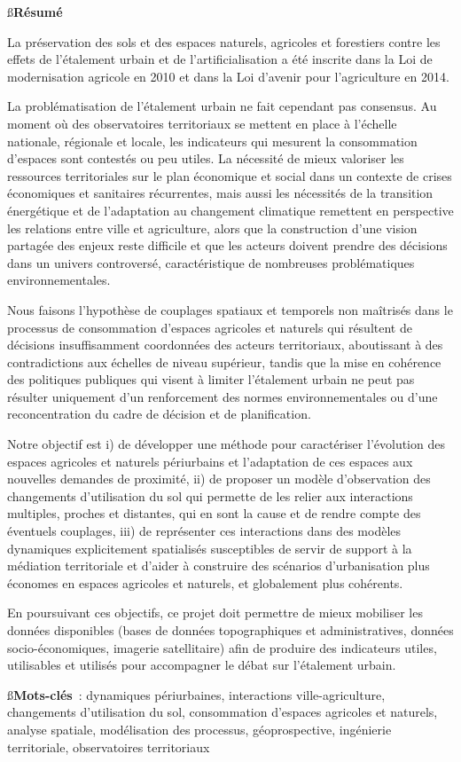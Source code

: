{\ss\bf Résumé}

La préservation des sols et des espaces naturels, agricoles et forestiers
contre les effets de l'étalement urbain et de l'artificialisation
a été inscrite dans la Loi de modernisation agricole en 2010
et dans la Loi d'avenir pour l'agriculture en 2014.

La problématisation de l'étalement urbain ne fait cependant pas consensus.
Au moment où des observatoires territoriaux
se mettent en place à l'échelle nationale, régionale et locale,
les indicateurs qui mesurent la consommation d'espaces sont contestés ou peu utiles.
La nécessité de mieux valoriser les ressources territoriales sur le plan économique
et social dans un contexte de crises économiques et sanitaires récurrentes,
mais aussi les nécessités de la transition énergétique et de l'adaptation au changement climatique
remettent en perspective les relations entre ville et agriculture,
alors que la construction d'une vision partagée des enjeux reste difficile
et que les acteurs doivent prendre des décisions dans un univers controversé,
caractéristique de nombreuses problématiques environnementales.

Nous faisons l'hypothèse de couplages spatiaux et temporels non maîtrisés dans le processus
de consommation d'espaces agricoles et naturels
qui résultent de décisions insuffisamment coordonnées des acteurs territoriaux,
aboutissant à des contradictions aux échelles de niveau supérieur,
tandis que la mise en cohérence des politiques publiques
qui visent à limiter l'étalement urbain ne peut pas résulter uniquement
d'un renforcement des normes environnementales ou d'une reconcentration
du cadre de décision et de planification.

Notre objectif est i) de développer une méthode pour caractériser
l'évolution des espaces agricoles et naturels périurbains et l'adaptation
de ces espaces aux nouvelles demandes de proximité,
ii) de proposer un modèle d'observation des changements d'utilisation du sol
qui permette de les relier aux interactions multiples, proches et distantes,
qui en sont la cause et de rendre compte des éventuels couplages,
iii) de représenter ces interactions dans des modèles dynamiques explicitement spatialisés
susceptibles de servir de support à la médiation territoriale 
et d'aider à construire des scénarios d'urbanisation
plus économes en espaces agricoles et naturels, et globalement plus cohérents.

En poursuivant ces objectifs,
ce projet doit permettre de mieux mobiliser les données disponibles
(bases de données topographiques et administratives, données socio-économiques,
imagerie satellitaire) afin de produire des indicateurs
utiles, utilisables et utilisés pour accompagner le débat
sur l'étalement urbain.

\blank[2*big]

{\ss\bf Mots-clés} :
dynamiques périurbaines, interactions ville-agriculture,
changements d'utilisation du sol, consommation d'espaces agricoles et naturels,
analyse spatiale, modélisation des processus,
géoprospective, ingénierie territoriale, observatoires territoriaux
